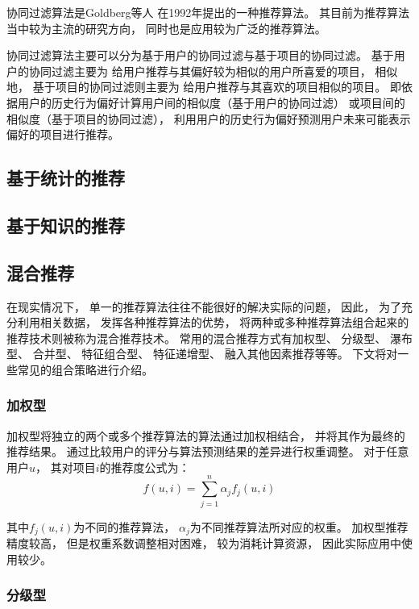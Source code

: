 协同过滤算法是Goldberg等人
\cite{goldbergUsingCollaborativeFiltering1992}
在1992年提出的一种推荐算法。
其目前为推荐算法当中较为主流的研究方向，
同时也是应用较为广泛的推荐算法。

协同过滤算法主要可以分为基于用户的协同过滤与基于项目的协同过滤。
基于用户的协同过滤主要为
给用户推荐与其偏好较为相似的用户所喜爱的项目，
相似地，
基于项目的协同过滤则主要为
给用户推荐与其喜欢的项目相似的项目。
即依据用户的历史行为偏好计算用户间的相似度（基于用户的协同过滤）
或项目间的相似度（基于项目的协同过滤），
利用用户的历史行为偏好预测用户未来可能表示偏好的项目进行推荐。

\subsection{基于统计的推荐}

\subsection{基于知识的推荐}

\subsection{混合推荐}

在现实情况下，
单一的推荐算法往往不能很好的解决实际的问题，
因此，
为了充分利用相关数据，
发挥各种推荐算法的优势，
将两种或多种推荐算法组合起来的推荐技术则被称为混合推荐技术。
常用的混合推荐方式有加权型、
分级型、
瀑布型、
合并型、
特征组合型、
特征递增型、
融入其他因素推荐等等。
下文将对一些常见的组合策略进行介绍\cite{heJiYuJuanJiShenJingWangLuoDeYinLeTuiJianXiTong2019}。

\subsubsection{加权型}

加权型将独立的两个或多个推荐算法的算法通过加权相结合，
并将其作为最终的推荐结果。
通过比较用户的评分与算法预测结果的差异进行权重调整。
对于任意用户$u$，
其对项目$i$的推荐度公式为：
\begin{equation}
    f(u,i)=\sum_{j=1}^n\alpha_jf_j(u,i)
\end{equation}

其中$f_j(u,i)$为不同的推荐算法，
$\alpha_j$为不同推荐算法所对应的权重。
加权型推荐精度较高，
但是权重系数调整相对困难，
较为消耗计算资源，
因此实际应用中使用较少。

\subsubsection{分级型}

